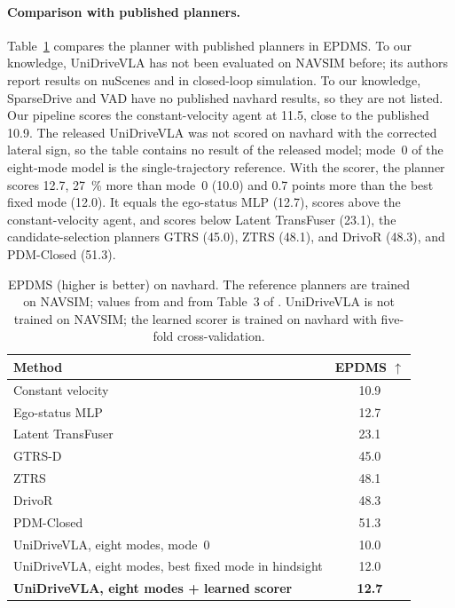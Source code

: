 \documentclass[11pt, a4paper, oneside]{book}
\begin{document}
\paragraph{Comparison with published planners.}
\label{sec:navhard}
Table~\ref{tab:navhard} compares the planner with published planners in EPDMS. To our
knowledge, UniDriveVLA has not been evaluated on NAVSIM before; its authors report results on
nuScenes and in closed-loop simulation. To our knowledge, SparseDrive and VAD have no published
navhard results, so they are not listed. Our pipeline scores the constant-velocity agent at
\num{11.5}, close to the published \num{10.9}. The released UniDriveVLA was not scored on navhard
with the corrected lateral sign, so the table contains no result of the released model; mode~0
of the eight-mode model is the single-trajectory reference. With the scorer, the planner scores \num{12.7},
\SI{27}{\percent} more than mode~0 (\num{10.0}) and \num{0.7} points more than the best fixed mode
(\num{12.0}). It equals the ego-status MLP (\num{12.7}), scores above the constant-velocity
agent, and scores below Latent TransFuser (\num{23.1}), the candidate-selection planners GTRS
(\num{45.0}), ZTRS (\num{48.1}), and DrivoR (\num{48.3}), and PDM-Closed (\num{51.3}).

\begin{table}[ht]
\centering
\caption[EPDMS on navhard]{EPDMS (higher is better) on navhard. The reference
planners are trained on NAVSIM; values from \cite{pseudosim} and from Table~3 of
\cite{drivor}. UniDriveVLA
is not trained on NAVSIM; the learned scorer is trained on navhard with five-fold
cross-validation.}
\label{tab:navhard}
\begin{tabular}{lc}
\toprule
Method & EPDMS $\uparrow$ \\
\midrule
Constant velocity \cite{pseudosim} & 10.9 \\
Ego-status MLP \cite{pseudosim} & 12.7 \\
Latent TransFuser \cite{transfuser,pseudosim} & 23.1 \\
GTRS-D \cite{gtrs,drivor} & 45.0 \\
ZTRS \cite{ztrs,drivor} & 48.1 \\
DrivoR \cite{drivor} & 48.3 \\
PDM-Closed \cite{pdm} & 51.3 \\
\midrule
UniDriveVLA, eight modes, mode~0 & 10.0 \\
UniDriveVLA, eight modes, best fixed mode in hindsight & 12.0 \\
\textbf{UniDriveVLA, eight modes + learned scorer} & \textbf{12.7} \\
\bottomrule
\end{tabular}
\end{table}
\end{document}
